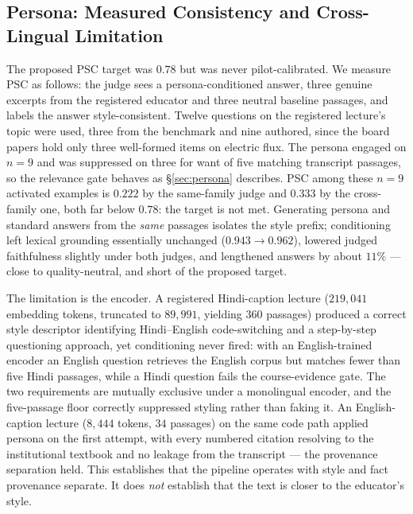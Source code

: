 \documentclass[conference]{IEEEtran}
\begin{document}
\subsection{Persona: Measured Consistency and Cross-Lingual Limitation}
\label{sec:pscval}
The proposed PSC target was $0.78$ but was never pilot-calibrated. We measure
PSC as follows: the judge sees a persona-conditioned answer, three genuine
excerpts from the registered educator and three neutral baseline passages, and
labels the answer style-consistent. Twelve questions on the registered lecture's
topic were used, three from the benchmark and nine authored, since the board
papers hold only three well-formed items on electric flux. The persona engaged
on $n=9$ and was suppressed on three for want of five matching transcript
passages, so the relevance gate behaves as §\ref{sec:persona} describes. PSC
among these $n=9$ activated examples is $0.222$ by the same-family judge and
$0.333$ by the cross-family one, both far below $0.78$: the target is not met.
Generating persona and standard answers from the \emph{same} passages isolates
the style prefix; conditioning left lexical grounding essentially unchanged
($0.943 \rightarrow 0.962$), lowered judged faithfulness slightly under both
judges, and lengthened answers by about $11\%$ --- close to quality-neutral, and
short of the proposed target.

The limitation is the encoder. A registered Hindi-caption lecture ($219{,}041$
embedding tokens, truncated to $89{,}991$, yielding $360$ passages) produced a
correct style descriptor identifying Hindi--English code-switching and a
step-by-step questioning approach, yet conditioning never fired: with an
English-trained encoder an English question retrieves the English corpus but
matches fewer than five Hindi passages, while a Hindi question fails the
course-evidence gate. The two requirements are mutually exclusive under a
monolingual encoder, and the five-passage floor correctly suppressed styling
rather than faking it. An English-caption lecture ($8{,}444$ tokens, $34$
passages) on the same code path applied persona on the first attempt, with every
numbered citation resolving to the institutional textbook and no leakage from
the transcript --- the provenance separation held. This establishes that the
pipeline operates with style and fact provenance separate. It does \emph{not}
establish that the text is closer to the educator's style.
\end{document}
